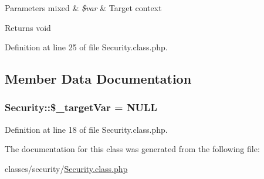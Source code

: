 \begin{DoxyParams}[1]{Parameters}
mixed & {\em \$var} & Target context \\
\hline
\end{DoxyParams}
\begin{DoxyReturn}{Returns}
void 
\end{DoxyReturn}


Definition at line 25 of file Security.\+class.\+php.



\subsection{Member Data Documentation}
\subsubsection[{\texorpdfstring{\$\+\_\+target\+Var}{$_targetVar}}]{\setlength{\rightskip}{0pt plus 5cm}Security\+::\$\+\_\+target\+Var = N\+U\+LL}\hypertarget{classSecurity_a28ff37b08bd7a592552cf5af13f7ac74}{}\label{classSecurity_a28ff37b08bd7a592552cf5af13f7ac74}


Definition at line 18 of file Security.\+class.\+php.



The documentation for this class was generated from the following file\+:\begin{DoxyCompactItemize}
\item 
classes/security/\hyperlink{Security_8class_8php}{Security.\+class.\+php}\end{DoxyCompactItemize}
